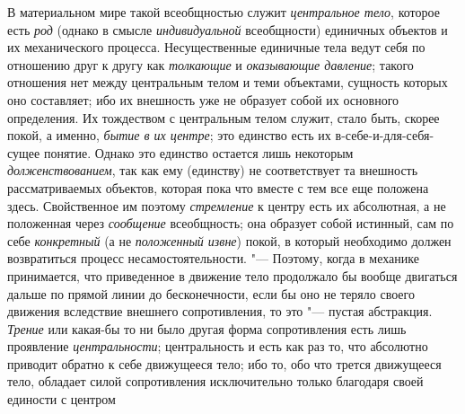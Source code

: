 {{В материальном мире такой всеобщностью служит
{\em центральное тело},
которое есть {\em род}
(однако в смысле
{\em индивидуальной}
всеобщности) единичных объектов и их механического процесса.
Несущественные единичные тела ведут себя по отношению друг к другу как
{\em толкающие} и
{\em оказывающие давление};
такого отношения нет между центральным телом и теми
объектами, сущность которых оно составляет; ибо их внешность уже не
образует собой их основного определения. Их тождеством с центральным телом
служит, стало быть, скорее покой, а именно,
{\em бытие в их центре};
это единство есть их в-себе-и-для-себя-сущее понятие. Однако
это единство остается лишь некоторым
{\em долженствованием},
так как ему (единству) не соответствует та внешность
рассматриваемых объектов, которая пока что вместе с тем все еще положена
здесь. Свойственное им поэтому
{\em стремление} к центру
есть их абсолютная, а не положенная через
{\em сообщение}
всеобщность; она образует собой истинный, сам по себе
{\em конкретный} (а не
{\em положенный извне})
покой, в который необходимо должен возвратиться процесс
несамостоятельности. "--- Поэтому, когда в механике
принимается, что приведенное в движение тело продолжало бы вообще двигаться
дальше по прямой линии до бесконечности, если бы оно не теряло своего
движения вследствие внешнего сопротивления, то это "--- пустая
абстракция. {\em Трение}
или какая-бы то ни было другая форма
сопротивления есть лишь проявление
{\em центральности};
центральность и есть как раз то, что абсолютно приводит
обратно к себе движущееся тело; ибо то, обо что трется движущееся тело,
обладает силой сопротивления исключительно только благодаря своей единости
с
центром}}
